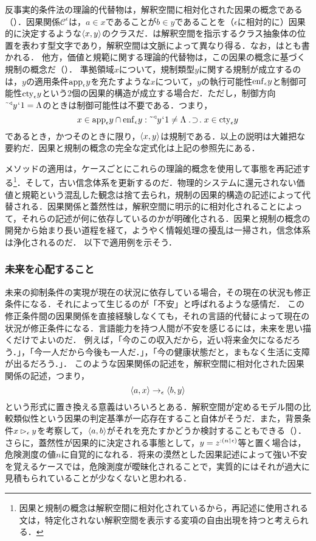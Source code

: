 反事実的条件法の理論的代替物は，解釈空間に相対化された因果の概念である（）．因果関係$\mathcal{C}^\epsilon$は，$ a\in x $であることが$ b\in y $であることを（$\epsilon$に相対的に）因果的に決定するような$\langle x,y \rangle$のクラスだ．\kagi{$ \epsilon $}は解釈空間を指示するクラス抽象体の位置を表わす型文字であり，解釈空間は文脈によって異なり得る．なお，はとも書かれる．
他方，価値と規範に関する理論的代替物は，この因果の概念に基づく規制の概念だ（）．
準拠領域$x$について，規制類型$y$に関する規制が成立するのは，$y$の適用条件$ \mathrm{app}_{\epsilon}y $を充たすような$x$について，$y$の執行可能性$\mathrm{enf}_{\epsilon}y$と制御可能性$\mathrm{cty}_{\epsilon}y$という2個の因果的構造が成立する場合だ．ただし，制御方向$\tilde{\:\:}{^\triangleleft}y{\mspace{1mu}{`}\mspace{1mu}} 1 = \Lambda$のときは制御可能性は不要である．つまり，
\[
    x\in\app{\epsilon}y\cap \enf{\epsilon}y\con{2}\tildel{\trgl{y}}\fap 1 \neq \Lambda\case{1}{1}{1}x\in\cty{\epsilon}y
\]
であるとき，かつそのときに限り，$\langle x,y \rangle$は規制である．以上の説明は大雑把な要約だ．因果と規制の概念の完全な定式化は上記の参照先にある．

メソッドの適用は，ケースごとにこれらの理論的概念を使用して事態を再記述する\footnote{
    因果と規制の概念は解釈空間に相対化されているから，再記述に使用される文は，特定化されない解釈空間を表示する変項の自由出現を持つと考えられる．
}．そして，古い信念体系を更新するのだ．物理的システムに還元されない価値と規範という混乱した観念は捨て去られ，規制の因果的構造の記述によって代替される．因果関係と蓋然性は，解釈空間に明示的に相対化されることによって，それらの記述が何に依存しているのかが明確化される．因果と規制の概念の開発から始まり長い道程を経て，ようやく情報処理の擾乱は一掃され，信念体系は浄化されるのだ．
以下で適用例を示そう．

\subsubsection{未来を心配すること}
\label{sssec:未来を心配する}

未来の抑制条件の実現が現在の状況に依存している場合，その現在の状況も修正条件になる．それによって生じるのが「不安」と呼ばれるような感情だ．
この修正条件間の因果関係を直接経験しなくても，それの言語的代替によって現在の状況が修正条件になる．言語能力を持つ人間が不安を感じるには，未来を思い描くだけでよいのだ．
例えば，「今のこの収入だから，近い将来金欠になるだろう．」，「今一人だから今後も一人だ．」，「今の健康状態だと，まもなく生活に支障が出るだろう．」．
このような因果関係の記述を，解釈空間に相対化された因果関係の記述，つまり，
\[
   \langle a,x \rangle\to_{\epsilon}\langle b,y \rangle
\]
という形式に置き換える意義はいろいろとある．解釈空間が定めるモデル間の比較類似性という因果の判定基準が一応存在すること自体がそうだ．また，背景条件$ x\mathbin{\vartriangleright_{\epsilon}}y $を考察して，$\langle a,b \rangle$がそれを充たすかどうか検討することもできる（）．さらに，蓋然性が因果的に決定される事態として，$ y = z^{:(n\mathbin{\upharpoonleft}\epsilon)} $等と置く場合は，危険測度の値$n$に自覚的になれる．将来の漠然とした因果記述によって強い不安を覚えるケースでは，危険測度が曖昧化されることで，実質的にはそれが過大に見積もられていることが少なくないと思われる．

